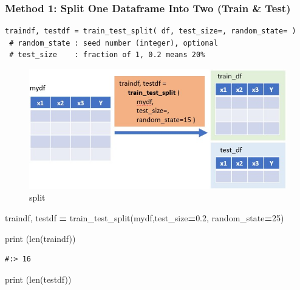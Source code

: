 \documentclass[
]{book}
\newenvironment{Shaded}{\begin{snugshade}}{\end{snugshade}}
\newcommand{\BuiltInTok}[1]{#1}
\newcommand{\DecValTok}[1]{\textcolor[rgb]{0.06,0.06,0.06}{#1}}
\newcommand{\FloatTok}[1]{\textcolor[rgb]{0.06,0.06,0.06}{#1}}
\newcommand{\NormalTok}[1]{#1}
\newcommand{\OperatorTok}[1]{\textcolor[rgb]{0.43,0.43,0.43}{\textbf{#1}}}
\begin{document}
\hypertarget{method-1-split-one-dataframe-into-two-train-test}{%
\subsubsection{Method 1: Split One Dataframe Into Two (Train \& Test)}\label{method-1-split-one-dataframe-into-two-train-test}}

\begin{verbatim}
traindf, testdf = train_test_split( df, test_size=, random_state= ) 
 # random_state : seed number (integer), optional
 # test_size    : fraction of 1, 0.2 means 20%
\end{verbatim}

\begin{figure}
\centering
\includegraphics{img/train_test_split_1.jpg}
\caption{split}
\end{figure}

\begin{Shaded}
\begin{Highlighting}[]
\NormalTok{traindf, testdf }\OperatorTok{=}\NormalTok{ train_test_split(mydf,test_size}\OperatorTok{=}\FloatTok{0.2}\NormalTok{, random_state}\OperatorTok{=}\DecValTok{25}\NormalTok{)}
\end{Highlighting}
\end{Shaded}

\begin{Shaded}
\begin{Highlighting}[]
\BuiltInTok{print}\NormalTok{ (}\BuiltInTok{len}\NormalTok{(traindf))}
\end{Highlighting}
\end{Shaded}

\begin{verbatim}
#:> 16
\end{verbatim}

\begin{Shaded}
\begin{Highlighting}[]
\BuiltInTok{print}\NormalTok{ (}\BuiltInTok{len}\NormalTok{(testdf))}
\end{Highlighting}
\end{Shaded}
\end{document}
